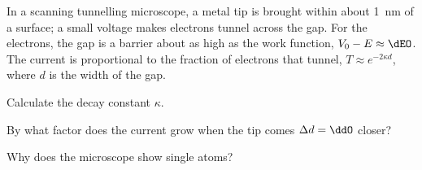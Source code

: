 In a scanning tunnelling microscope, a metal tip is brought within about \SI{1}{\nano\m} of a surface; a small voltage makes electrons tunnel across the gap. For the electrons, the gap is a barrier about as high as the work function, $V_0-E \approx \dEO$. The current is proportional to the fraction of electrons that tunnel, $T \approx e^{-2\kappa d}$, where $d$ is the width of the gap.

\begin{abcliste}
\abc Calculate the decay constant $\kappa$.

\abc By what factor does the current grow when the tip comes $\Delta d = \ddO$ closer?

\abc Why does the microscope show single atoms?
\end{abcliste}
